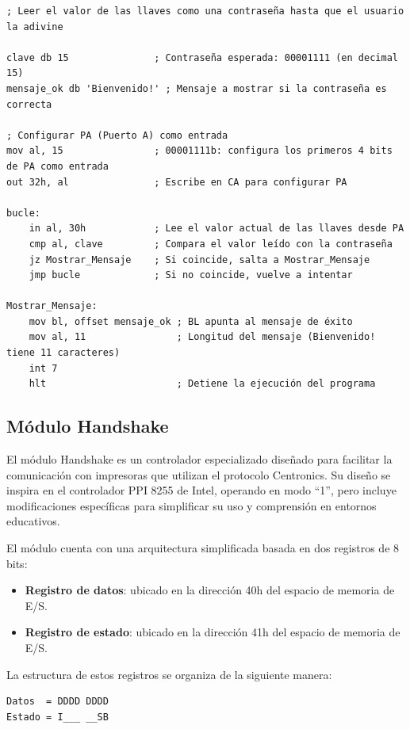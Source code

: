 \documentclass[12pt,oneside]{templates/unerthesis}
\providecommand{\tightlist}{%
  \setlength{\itemsep}{0pt}\setlength{\parskip}{0pt}}
\begin{document}
\begin{lstlisting}
; Leer el valor de las llaves como una contraseña hasta que el usuario la adivine

clave db 15               ; Contraseña esperada: 00001111 (en decimal 15)
mensaje_ok db 'Bienvenido!' ; Mensaje a mostrar si la contraseña es correcta

; Configurar PA (Puerto A) como entrada
mov al, 15                ; 00001111b: configura los primeros 4 bits de PA como entrada
out 32h, al               ; Escribe en CA para configurar PA

bucle:
    in al, 30h            ; Lee el valor actual de las llaves desde PA
    cmp al, clave         ; Compara el valor leído con la contraseña
    jz Mostrar_Mensaje    ; Si coincide, salta a Mostrar_Mensaje
    jmp bucle             ; Si no coincide, vuelve a intentar

Mostrar_Mensaje:
    mov bl, offset mensaje_ok ; BL apunta al mensaje de éxito
    mov al, 11                ; Longitud del mensaje (Bienvenido! tiene 11 caracteres)
    int 7
    hlt                       ; Detiene la ejecución del programa\end{lstlisting}

\hypertarget{muxf3dulo-handshake}{%
\subsection{Módulo Handshake}\label{muxf3dulo-handshake}}

El módulo Handshake es un controlador especializado diseñado para facilitar la comunicación con impresoras que utilizan el protocolo Centronics. Su diseño se inspira en el controlador PPI 8255 de Intel, operando en modo ``1'', pero incluye modificaciones específicas para simplificar su uso y comprensión en entornos educativos.

El módulo cuenta con una arquitectura simplificada basada en dos registros de 8 bits:

\begin{itemize}
\tightlist
\item
  \textbf{Registro de datos}: ubicado en la dirección 40h del espacio de memoria de E/S.
\item
  \textbf{Registro de estado}: ubicado en la dirección 41h del espacio de memoria de E/S.
\end{itemize}

La estructura de estos registros se organiza de la siguiente manera:

\begin{verbatim}
Datos  = DDDD DDDD
Estado = I___ __SB
\end{verbatim}
\end{document}
